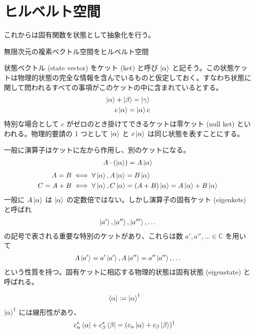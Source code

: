 \documentclass[uplatex,dvipdfmx,a4paper,11pt]{jlreq}
\newcommand{\CC}{\mathbb{C}}
\theoremstyle{definition}
\begin{document}
\section{ヒルベルト空間}
これからは固有関数を状態として抽象化を行う。
\begin{definition}
  無限次元の複素ベクトル空間をヒルベルト空間
\end{definition}
\begin{definition}[ケット空間]
  状態ベクトル (state vector) をケット (ket) と呼び $\ket{\alpha}$ と記そう。この状態ケットは物理的状態の完全な情報を含んでいるものと仮定しておく。すなわち状態に関して問われるすべての事項がこのケットの中に含まれているとする。
  \begin{align}
    \ket{\alpha} + \ket{\beta} = \ket{\gamma} \\
    c\ket{\alpha} = \ket{\alpha}c
  \end{align}
  特別な場合として $c$ がゼロのとき掛けてできるケットは零ケット (null ket) といわれる。物理的要請の 1 つとして $\ket{\alpha}$ と $c\ket{\alpha}$ は同じ状態を表すことにする。
\end{definition}

\begin{definition}[演算子]
  一般に演算子はケットに左から作用し、別のケットになる。
  \begin{align}
    A\cdot(\ket{\alpha}) = A\ket{\alpha}
  \end{align}
  \begin{align}
    A = B     & \iff \forall \ket{\alpha}, A\ket{\alpha} = B\ket{\alpha}                                       \\
    C = A + B & \iff \forall \ket{\alpha}, C\ket{\alpha} = (A + B)\ket{\alpha} = A\ket{\alpha} + B\ket{\alpha}
  \end{align}
  一般に $A\ket{\alpha}$ は $\ket{\alpha}$ の定数倍ではない。しかし演算子の固有ケット (eigenkets) と呼ばれ
  \begin{align}
    \ket{a'},\ket{a''},\ket{a'''},\ldots
  \end{align}
  の記号で表される重要な特別のケットがあり、これらは数 $a',a'',\ldots\in\CC$ を用いて
  \begin{align}
    A\ket{a'} = a'\ket{a'},A\ket{a''} = a''\ket{a''},\ldots
  \end{align}
  という性質を持つ。固有ケットに相応する物理的状態は固有状態 (eigenstate) と呼ばれる。
\end{definition}

\begin{definition}[ブラ空間]
  \begin{align}
    \bra{\alpha} & := \ket{\alpha}^\dagger
  \end{align}
  $\ket{\alpha}^\dagger$ には線形性があり、
  \begin{align}
    c_{\alpha}^*\bra{\alpha} + c_{\beta}^*\bra{\beta} & = (c_{\alpha}\ket{\alpha} + c_{\beta}\ket{\beta})^\dagger
  \end{align}
\end{definition}
\end{document}
